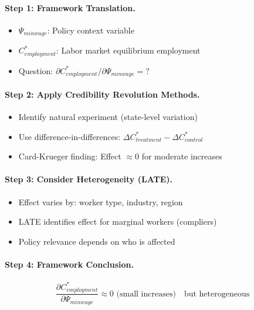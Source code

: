 \paragraph{Step 1: Framework Translation.}
\begin{itemize}
    \item $\Psi_{min wage}$: Policy context variable
    \item $C^*_{employment}$: Labor market equilibrium employment
    \item Question: $\partial C^*_{employment}/\partial \Psi_{min wage} = ?$
\end{itemize}

\paragraph{Step 2: Apply Credibility Revolution Methods.}
\begin{itemize}
    \item Identify natural experiment (state-level variation)
    \item Use difference-in-differences: $\Delta C^*_{treatment} - \Delta C^*_{control}$
    \item Card-Krueger finding: Effect $\approx 0$ for moderate increases
\end{itemize}

\paragraph{Step 3: Consider Heterogeneity (LATE).}
\begin{itemize}
    \item Effect varies by: worker type, industry, region
    \item LATE identifies effect for marginal workers (compliers)
    \item Policy relevance depends on who is affected
\end{itemize}

\paragraph{Step 4: Framework Conclusion.}
\begin{equation}
\frac{\partial C^*_{employment}}{\partial \Psi_{min wage}} \approx 0 \text{ (small increases)} \quad \text{but heterogeneous}
\end{equation}

% 
